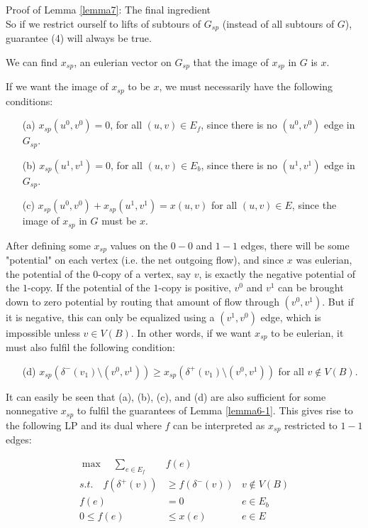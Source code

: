\documentclass[./main.tex]{subfiles}
\begin{document}
\begin{subsection}{Proof of Lemma \ref{lemma7}: The final ingredient}
		\\So if we restrict ourself to lifts of subtours of $G_{sp}$ (instead of all subtours of $G$), guarantee (4) will always be true.\vspace{2mm}
		\begin{lemma}
		\label{lemma6-1}		We can find $x_{sp}$, an eulerian vector on $G_{sp}$ that the image of $x_{sp}$ in $G$ is $x$.
		\end{lemma}
		If we want the image of $x_{sp}$ to be $x$, we must necessarily have the following conditions:
		\begin{itemize}
			\item[(a)] $x_{sp}(u^0,v^0) = 0$, for all $(u,v)\in E_f$, since there is no $(u^0,v^0)$ edge in $G_{sp}$.
			\item[(b)] $x_{sp}(u^1,v^1) = 0$, for all $(u,v)\in E_b$, since there is no $(u^1,v^1)$ edge in $G_{sp}$.
			\item[(c)] $x_{sp}(u^0,v^0)+x_{sp}(u^1,v^1) = x(u,v)$ for all $(u,v)\in E$, since the image of $x_{sp}$ in $G$ must be $x$.
		\end{itemize}
\vspace{2mm}
After defining some $x_{sp}$ values on the $0-0$ and $1-1$ edges, there will be some "potential" on each vertex (i.e. the net outgoing flow), and since $x$ was eulerian, the potential of the $0$-copy of a vertex, say $v$, is exactly the negative potential of the $1$-copy.
		If the potential of the $1$-copy is positive, $v^0$ and $v^1$ can be brought down to zero potential by routing that amount of flow through $(v^0,v^1)$. 
		But if it is negative, this can only be equalized using a $(v^1,v^0)$ edge, which is impossible unless $v\in V(B)$. In other words, if we want $x_{sp}$ to be eulerian, it must also fulfil the following condition:
		\begin{itemize}
			\item[(d)] $x_{sp}(\delta^-(v_1)\setminus (v^0,v^1) )\geq x_{sp}(\delta^+(v_1)\setminus (v^0,v^1))$ for all $v\notin V(B)$.
		\end{itemize}

		It can easily be seen that (a), (b), (c), and (d) are also sufficient for some nonnegative $x_{sp}$ to fulfil the guarantees of Lemma \ref{lemma6-1}.
		 This gives rise to the following LP and its dual where $f$ can be interpreted as $x_{sp}$ restricted to $1-1$ edges:\vspace{2mm}\\
		\begin{minipage}{0.39\textwidth}
		\begin{align*}
			\max\quad\sum_{e\in E_f}&f(e)\\
			s.t.\quad f(\delta^+(v))&\geq f(\delta^-(v))   &v\notin V(B)              \\
			f(e)&=0  &e\in E_b\\
			0\leq f(e)&\leq x(e) &e\in E\\
		\end{align*}
		\end{minipage}
	\end{subsection}
\end{document}
